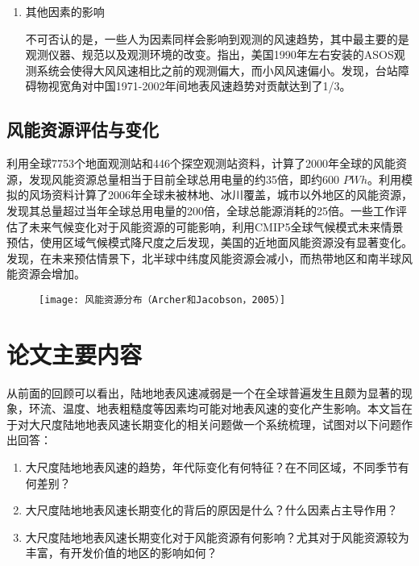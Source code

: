 \begin{enumerate}
\item 其他因素的影响

不可否认的是，一些人为因素同样会影响到观测的风速趋势，其中最主要的是观测仪器、规范以及观测环境的改变。\citet{mckee2000climate}指出，美国1990年左右安装的ASOS观测系统会使得大风风速相比之前的观测偏大，而小风风速偏小。\citet{刘学锋2012台站观测环境改变对我国近地面风速观测资料序列的影响}发现，台站障碍物视宽角对中国1971-2002年间地表风速趋势对贡献达到了1/3。

\end{enumerate}

\subsection{风能资源评估与变化}

\citet{archer2005evaluation}利用全球7753个地面观测站和446个探空观测站资料，计算了2000年全球的风能资源，发现风能资源总量相当于目前全球总用电量的约35倍，即约600 $PWh$。\citet{lu2009global}利用模拟的风场资料计算了2006年全球未被林地、冰川覆盖，城市以外地区的风能资源，发现其总量超过当年全球总用电量的200倍，全球总能源消耗的25倍。一些工作评估了未来气候变化对于风能资源的可能影响，\citet{pryor2011assessing}利用CMIP5全球气候模式未来情景预估，使用区域气候模式降尺度之后发现，美国的近地面风能资源没有显著变化。\citet{karnauskas2018southward}发现，在未来预估情景下，北半球中纬度风能资源会减小，而热带地区和南半球风能资源会增加。

\begin{figure}[!htbp]
    \centering
    \texttt{[image: 风能资源分布（Archer和Jacobson，2005）]}
    \label{fig:windenergyArcher2005}
\end{figure}

\section{论文主要内容}

从前面的回顾可以看出，陆地地表风速减弱是一个在全球普遍发生且颇为显著的现象，环流、温度、地表粗糙度等因素均可能对地表风速的变化产生影响。本文旨在于对大尺度陆地地表风速长期变化的相关问题做一个系统梳理，试图对以下问题作出回答：

\begin{enumerate}
\item 大尺度陆地地表风速的趋势，年代际变化有何特征？在不同区域，不同季节有何差别？
\item 大尺度陆地地表风速长期变化的背后的原因是什么？什么因素占主导作用？
\item 大尺度陆地地表风速长期变化对于风能资源有何影响？尤其对于风能资源较为丰富，有开发价值的地区的影响如何？
\end{enumerate}


